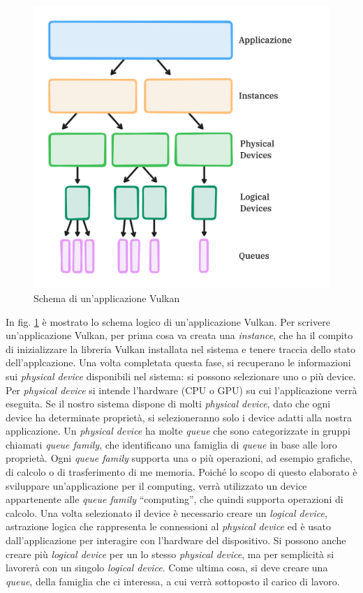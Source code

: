 \begin{figure}[ht]
    \centering
    \includegraphics[width=.9\linewidth]{images/chapter2/vulkan_scheme.png}
    \caption{Schema di un'applicazione Vulkan}
    \label{fig:vulkan_scheme}
\end{figure}

In fig. \ref{fig:vulkan_scheme} è mostrato lo schema logico di un'applicazione Vulkan. 
Per scrivere un'applicazione Vulkan, per prima cosa va creata una \textit{instance}, che ha il compito di inizializzare la libreria Vulkan installata nel sistema e tenere traccia dello stato dell'applcazione. Una volta completata questa fase, si recuperano le informazioni sui \textit{physical device} disponibili nel sistema: si possono selezionare uno o più device. Per \textit{physical device} si intende l'hardware (CPU o GPU) su cui l'applicazione verrà eseguita. Se il nostro sistema dispone di molti \textit{physical device}, dato che ogni device ha determinate proprietà, si selezioneranno solo i device adatti alla nostra applicazione. Un \textit{physical device} ha molte \textit{queue} che sono categorizzate in gruppi chiamati \textit{queue family}, che identificano una famiglia di \textit{queue} in base alle loro proprietà. Ogni \textit{queue family} supporta una o più operazioni, ad esempio grafiche, di calcolo o di trasferimento di me memoria. Poiché lo scopo di questo elaborato è sviluppare un'applicazione per il computing, verrà utilizzato un device appartenente alle \textit{queue family} ``computing'', che quindi supporta operazioni di calcolo. Una volta selezionato il device è necessario creare un \textit{logical device}, astrazione logica che rappresenta le connessioni al \textit{physical device} ed è usato dall'applicazione per interagire con l'hardware del dispositivo. Si possono anche creare più \textit{logical device} per un lo stesso \textit{physical device}, ma per semplicità si lavorerà con un singolo \textit{logical device}. Come ultima cosa, si deve creare una \textit{queue}, della famiglia che ci interessa, a cui verrà sottoposto il carico di lavoro.

